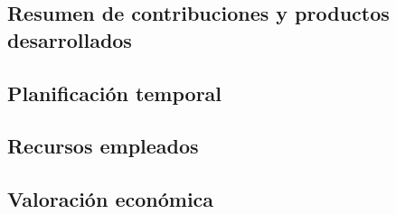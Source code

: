 \subsection{Resumen de contribuciones y productos desarrollados}\label{subsec:resumen-contribuciones}
\subsection{Planificación temporal}\label{subsec:planificacion-temporal}
\subsection{Recursos empleados}\label{subsec:recursos-empleados}
\subsection{Valoración económica}\label{subsec:valoracion-economica}
